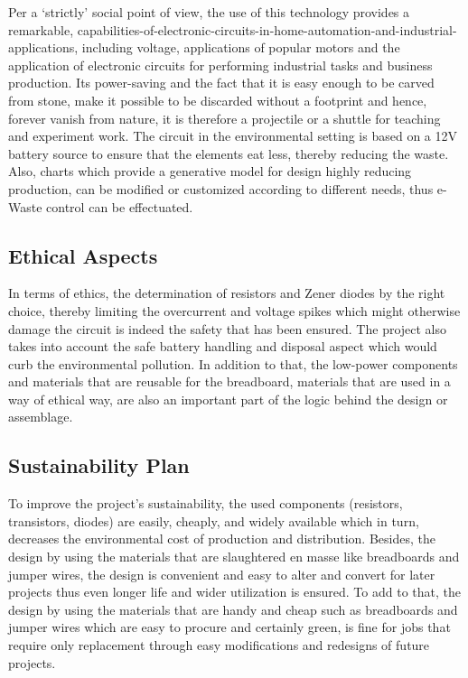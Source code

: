 Per a ‘strictly’ social point of view, the use of this technology provides a remarkable, capabilities-of-electronic-circuits-in-home-automation-and-industrial-applications, including voltage, applications of popular motors and the application of electronic circuits for performing industrial tasks and business production. Its power-saving and the fact that it is easy enough to be carved from stone, make it possible to be discarded without a footprint and hence, forever vanish from nature, it is therefore a projectile or a shuttle for teaching and experiment work.
The circuit in the environmental setting is based on a 12V battery source to ensure that the elements eat less, thereby reducing the waste. Also, charts which provide a generative model for design highly reducing production, can be modified or customized according to different needs, thus e-Waste control can be effectuated.\cite{b17}

\subsection{Ethical Aspects}

In terms of ethics, the determination of resistors and Zener diodes by the right choice, thereby limiting the overcurrent and voltage spikes which might otherwise damage the circuit is indeed the safety that has been ensured. The project also takes into account the safe battery handling and disposal aspect which would curb the environmental pollution. In addition to that, the low-power components and materials that are reusable for the breadboard, materials that are used in a way of ethical way, are also an important part of the logic behind the design or assemblage.

\subsection{Sustainability Plan}

To improve the project's sustainability, the used components (resistors, transistors, diodes) are easily, cheaply, and widely available which in turn, decreases the environmental cost of production and distribution. Besides, the design by using the materials that are slaughtered en masse like breadboards and jumper wires, the design is convenient and easy to alter and convert for later projects thus even longer life and wider utilization is ensured. To add to that, the design by using the materials that are handy and cheap such as breadboards and jumper wires which are easy to procure and certainly green, is fine for jobs that require only replacement through easy modifications and redesigns of future projects.\cite{b18}


